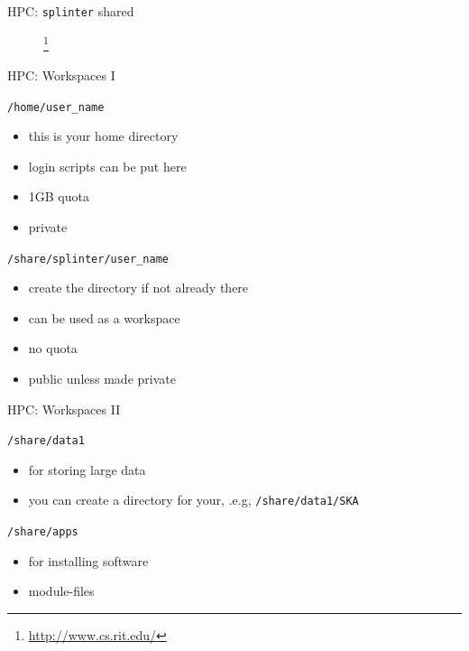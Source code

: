 \documentclass{beamer}
\begin{document}
\begin{frame}{HPC: \texttt{splinter} shared}
  \begin{figure}
    \begin{center}
      \footnote{\url{http://www.cs.rit.edu/}}
    \end{center}
  \end{figure}
\end{frame}

\begin{frame}{HPC: Workspaces I}
	\begin{block}{\texttt{/home/user\_name}}
		\begin{itemize}
			\item this is your home directory
			\item login scripts can be put here
			\item 1GB quota
			\item private
		\end{itemize}
	\end{block}
	\begin{block}{\texttt{/share/splinter/user\_name}}
		\begin{itemize}
			\item create the directory if not already there
			\item can be used as a workspace
			\item no quota
			\item public unless made private
		\end{itemize}
	\end{block}
\end{frame}

\begin{frame}{HPC: Workspaces II}
	\begin{block}{\texttt{/share/data1}}
		\begin{itemize}
			\item for storing large data
			\item you can create a directory for your, .e.g, \texttt{/share/data1/SKA}
		\end{itemize}
	\end{block}

	\begin{block}{\texttt{/share/apps}}
		\begin{itemize}
			\item for installing software
			\item module-files
		\end{itemize}
	\end{block}
\end{frame}
\end{document}
